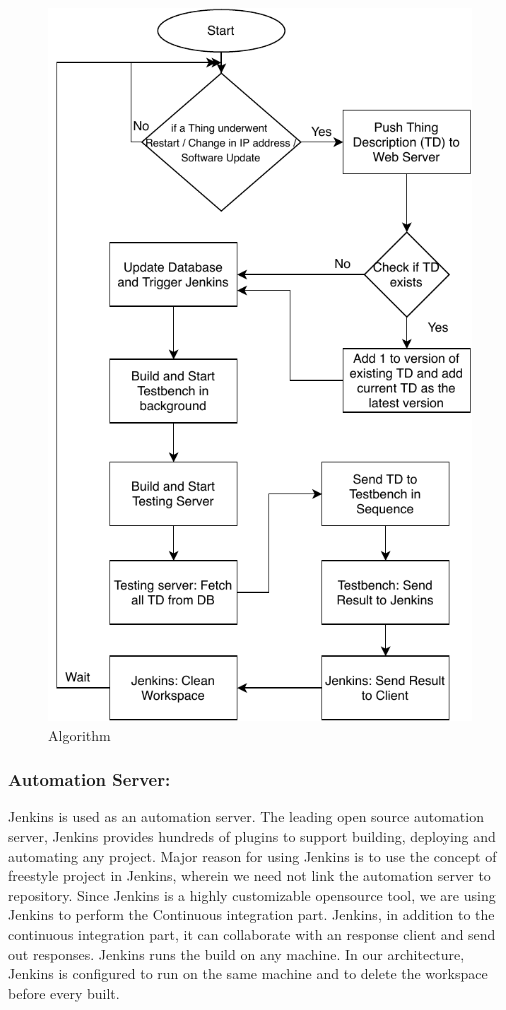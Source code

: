 \documentclass[conference]{IEEEtran}
\theoremstyle{definition}
\begin{document}
\begin{figure}[t]
  \centerline{\includegraphics[scale=0.6]{SystemFlowChart} }
  
  \caption{Algorithm}
  \label{fig:System Flow Chart}
\end{figure}

\subsubsection{Automation Server:}

Jenkins is used as an automation server. 
The leading open source automation server, Jenkins provides hundreds of plugins to support building, deploying and automating any project. 
Major reason for using Jenkins is to use the concept of freestyle project in Jenkins, wherein we need not link the automation server to repository. 
Since Jenkins is a highly customizable opensource tool, we are using Jenkins to perform the Continuous integration part.  
Jenkins, in addition to the continuous integration part, it can collaborate with an response client and send out responses. 
Jenkins runs the build on any machine. 
In our architecture, Jenkins is configured to run on the same machine and to delete the workspace before every built.
\end{document}
